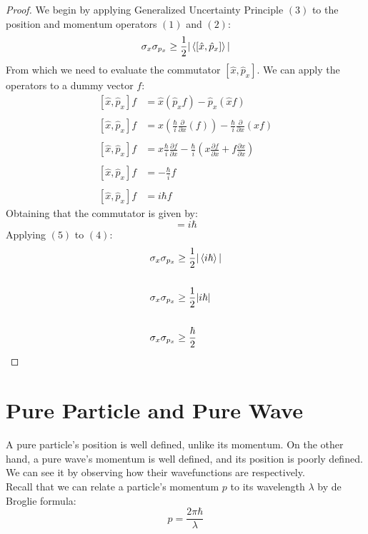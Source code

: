 \documentclass[hidelinks, a4paper, 12pt]{article}
\newcommand{\n}{\\[\baselineskip]}
\newcommand{\xhat}{\hat{x}}
\newcommand{\pxhat}{\hat{p}_x}
\begin{document}
        \begin{proof}
            We begin by applying Generalized Uncertainty Principle $(3)$ to the position and momentum operators $(1)$ and $(2)$:
            \begin{equation}
                \sigma_x \sigma_{p_x} \geq \frac{1}{2}|\braket{[\xhat, \pxhat]}|
            \end{equation}
            From which we need to evaluate the commutator $[\xhat, \pxhat]$. We can apply the operators to a dummy vector $f$:
            \[\begin{split}
                [\xhat, \pxhat]f &= \xhat(\pxhat f) - \pxhat(\xhat f)\\
                \\
                [\xhat, \pxhat]f &= x\left(\frac{\hbar}{i}\frac{\partial}{\partial x}(f)\right) - \frac{\hbar}{i}\frac{\partial}{\partial x}(xf)\\
                \\
                [\xhat, \pxhat]f &= x\frac{\hbar}{i}\frac{\partial f}{\partial x} - \frac{\hbar}{i}\left(x\frac{\partial f}{\partial x} + f\frac{\partial x}{\partial x}\right)\\
                \\
                [\xhat, \pxhat]f &= -\frac{\hbar}{i}f\\
                \\
                [\xhat, \pxhat]f &= i \hbar f                
            \end{split}\]
            Obtaining that the commutator is given by:
            \begin{equation}
                [\xhat, \pxhat] = i \hbar
            \end{equation}
            Applying $(5)$ to $(4)$:
            \[\begin{split}
                \sigma_x \sigma_{p_x} &\geq \frac{1}{2}|\braket{i \hbar}|\\
                \\
                \sigma_x \sigma_{p_x} &\geq \frac{1}{2}|i \hbar|\\
                \\
                \sigma_x \sigma_{p_x} &\geq \frac{\hbar}{2}
            \end{split}\]
        \end{proof}
    
    \section{Pure Particle and Pure Wave}
        A pure particle's position is well defined, unlike its momentum. On the other hand, a pure wave's momentum is well defined, and its position is poorly defined. We can 
        see it by observing how their wavefunctions are respectively.\n
        Recall that we can relate a particle's momentum $p$ to its wavelength $\lambda$ by de Broglie formula:
        \[p = \frac{2\pi \hbar}{\lambda}\]
\end{document}
